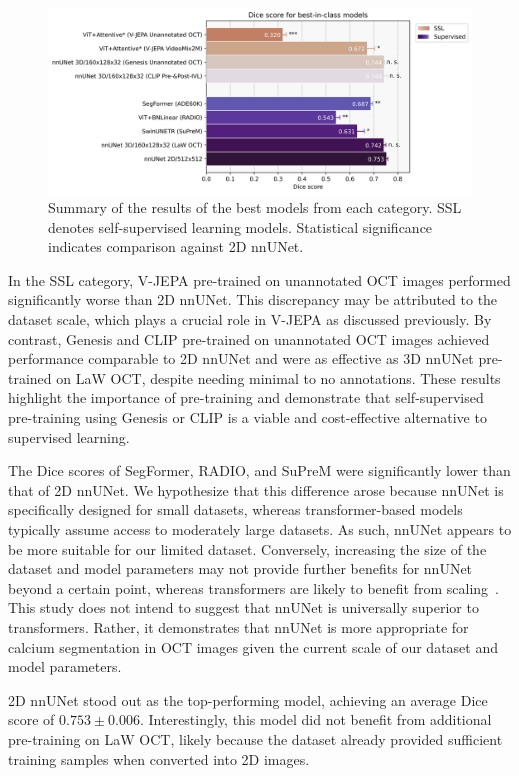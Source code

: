 \documentclass[a4paper,11pt,oneside]{report}
\begin{document}
\begin{figure}[hbt]
    \centering
    \includegraphics[width=1\textwidth]{figures/result_best_in_class_results.png}
    \caption{Summary of the results of the best models from each category. SSL denotes self-supervised learning models. Statistical significance indicates comparison against 2D nnUNet.}
    \label{fig:results}
\end{figure}

In the SSL category, V-JEPA pre-trained on unannotated OCT images performed significantly worse than 2D nnUNet. This discrepancy may be attributed to the dataset scale, which plays a crucial role in V-JEPA as discussed previously. By contrast, Genesis and CLIP pre-trained on unannotated OCT images achieved performance comparable to 2D nnUNet and were as effective as 3D nnUNet pre-trained on LaW OCT, despite needing minimal to no annotations. These results highlight the importance of pre-training and demonstrate that self-supervised pre-training using Genesis or CLIP is a viable and cost-effective alternative to supervised learning.

The Dice scores of SegFormer, RADIO, and SuPreM were significantly lower than that of 2D nnUNet. We hypothesize that this difference arose because nnUNet is specifically designed for small datasets, whereas transformer-based models typically assume access to moderately large datasets. As such, nnUNet appears to be more suitable for our limited dataset. Conversely, increasing the size of the dataset and model parameters may not provide further benefits for nnUNet beyond a certain point, whereas transformers are likely to benefit from scaling~\cite{Zhai2021}. This study does not intend to suggest that nnUNet is universally superior to transformers. Rather, it demonstrates that nnUNet is more appropriate for calcium segmentation in OCT images given the current scale of our dataset and model parameters.

2D nnUNet stood out as the top-performing model, achieving an average Dice score of $0.753 \pm 0.006$. Interestingly, this model did not benefit from additional pre-training on LaW OCT, likely because the dataset already provided sufficient training samples when converted into 2D images.
\end{document}
